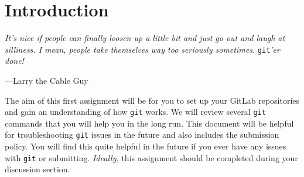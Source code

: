 \section{Introduction}

\textwidth
\epigraph{\emph{It's nice if people can finally loosen up a little bit
and just go out and laugh at silliness. I mean, people take themselves
way too seriously sometimes.}  \texttt{git}\emph{'er done!}}{---Larry the
Cable Guy}

\noindent The aim of this first assignment will be for you to set up your
GitLab repositories and gain an understanding of how \texttt{git} works.
We will review several \texttt{git} commands that you will help you in the long
run. This document will be helpful for troubleshooting \texttt{git} issues in
the future and also includes the submission policy. You will find this quite
helpful in the future if you ever have any issues with \texttt{git} or
submitting. \emph{Ideally,} this assignment should be completed during your
discussion section.
